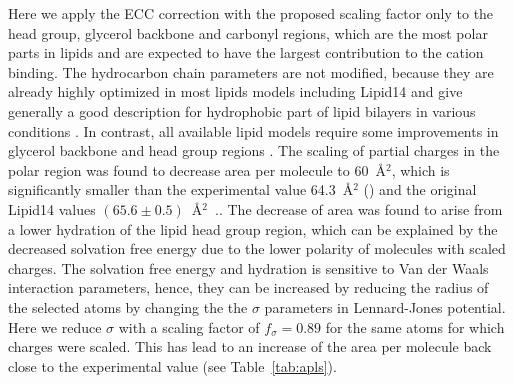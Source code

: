 \documentclass[aip,jcp,twocolumn]{revtex4}
\begin{document}
Here we apply the ECC correction with the proposed scaling factor only to the head group,
glycerol backbone and carbonyl regions, which are the most polar parts in lipids and
are expected to have the largest contribution to the cation binding.
The hydrocarbon chain parameters are not modified, because they are
already highly optimized in most lipids models including Lipid14 and
give generally a good description for hydrophobic part of lipid bilayers
in various conditions \cite{ollila16}.
In contrast, all available lipid models require
some improvements in glycerol backbone and head group regions \cite{botan15}. 
The scaling of partial charges in the polar region was found to decrease
area per molecule to 60~\AA$^2$, which is significantly smaller than the
experimental value 64.3~\AA$^2$ (\cite{}) and the original Lipid14 values $(65.6 \pm 0.5)$~\AA$^2$~\cite{dickson14}..  
The decrease of area was found to arise from a lower hydration of the lipid head group region,
which can be explained by the decreased solvation free energy due to the lower polarity
of molecules with scaled charges. 
The solvation free energy and hydration is sensitive to Van der Waals interaction parameters,
hence, they can be increased by reducing the radius of the selected atoms by changing the 
the $\sigma$ parameters in Lennard-Jones potential. 
Here we reduce $\sigma$ with a scaling factor of $f_\sigma = 0.89$ for the same atoms for which
charges were scaled. This has lead to an increase of the area per molecule back
close to the experimental value (see Table~\ref{tab:apls}). 
\end{document}
